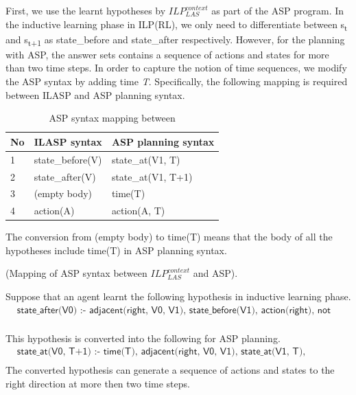First, we use the learnt hypotheses by $ILP_{LAS}^{context}$ as part of the ASP program.
In the inductive learning phase in ILP(RL), we only need to differentiate between s\textsubscript{t} and s\textsubscript{t+1} as \textsf{state\_before} and \textsf{state\_after} respectively.
However, for the planning with ASP, the answer sets contains a sequence of actions and states for more than two time steps. 
In order to capture the notion of time sequences, we modify the ASP syntax by 
adding time \textit{T}. Specifically, the following mapping is required between ILASP and ASP planning syntax.

\begin{table}[H]
\centering
\begin{tabular}{|l|p{5cm}|p{5cm}|}
\hline
No & ILASP syntax & ASP planning syntax\\ \hline
1 & \textsf{state\_before(V)} & \textsf{state\_at(V1, T)}  \\ \hline
2 & \textsf{state\_after(V)} & \textsf{state\_at(V1, T+1)}  \\ \hline
3 & \textsf{(empty body)} & \textsf{time(T)}  \\ \hline
4 & \textsf{action(A)} & \textsf{action(A, T)}  \\ \hline
\end{tabular}
\caption{ASP syntax mapping between }
\label{table:extension_specification}
\end{table}
The conversion from (empty body) to \textsf{time(T)} means that the body of all the hypotheses include \textsf{time(T)} in ASP planning syntax.
\begin{examp} \normalfont (Mapping of ASP syntax between $ILP_{LAS}^{context}$ and ASP).

Suppose that an agent learnt the following hypothesis in inductive learning phase. 
\begin{equation*}
\begin{split}
&\textsf{state\_after(V0) :- adjacent(right, V0, V1), state\_before(V1), action(right), not wall(V0).}\\
\end{split}
\end{equation*}

This hypothesis is converted into the following for ASP planning.
\begin{equation*}
\begin{split}
&\textsf{state\_at(V0, T+1) :- time(T), adjacent(right, V0, V1), state\_at(V1, T), action(right, T), not wall(V0).}\\
\end{split}
\end{equation*}
The converted hypothesis can generate a sequence of actions and states to the right direction at more then two time steps.
\end{examp}

